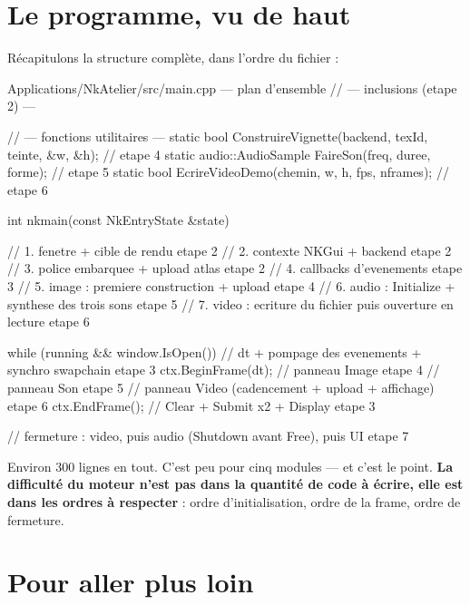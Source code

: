 \section{Le programme, vu de haut}

Récapitulons la structure complète, dans l'ordre du fichier :

\begin{nkcode}{Applications/NkAtelier/src/main.cpp — plan d'ensemble}
// --- inclusions (etape 2) ---

// --- fonctions utilitaires ---
static bool ConstruireVignette(backend, texId, teinte, &w, &h);   // etape 4
static audio::AudioSample FaireSon(freq, duree, forme);           // etape 5
static bool EcrireVideoDemo(chemin, w, h, fps, nframes);          // etape 6

int nkmain(const NkEntryState &state) {
    // 1. fenetre + cible de rendu                                   etape 2
    // 2. contexte NKGui + backend                                   etape 2
    // 3. police embarquee + upload atlas                            etape 2
    // 4. callbacks d'evenements                                     etape 3
    // 5. image : premiere construction + upload                     etape 4
    // 6. audio : Initialize + synthese des trois sons               etape 5
    // 7. video : ecriture du fichier puis ouverture en lecture      etape 6

    while (running && window.IsOpen()) {
        // dt + pompage des evenements + synchro swapchain           etape 3
        ctx.BeginFrame(dt);
        //   panneau Image                                           etape 4
        //   panneau Son                                             etape 5
        //   panneau Video (cadencement + upload + affichage)        etape 6
        ctx.EndFrame();
        // Clear + Submit x2 + Display                               etape 3
    }

    // fermeture : video, puis audio (Shutdown avant Free), puis UI  etape 7
}
\end{nkcode}

Environ 300 lignes en tout. C'est peu pour cinq modules — et c'est le point.
\textbf{La difficulté du moteur n'est pas dans la quantité de code à écrire, elle
est dans les ordres à respecter} : ordre d'initialisation, ordre de la frame,
ordre de fermeture.

\section{Pour aller plus loin}

